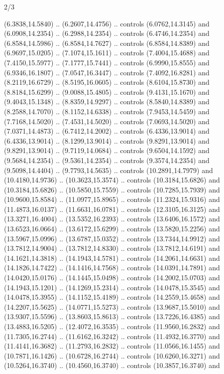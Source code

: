 \begin{flagdescription}{2/3}
\begin{scope}[yshift=\flagwidth,scale=\flagwidth/1241.93737]
\begin{scope}[y=-1mm, x=1mm,draw=gold,fill=blue,line join=miter,miter limit=4,line width=1.8\lw]
{  (6.3838,14.5840) .. (6.2607,14.4756) .. controls (6.0762,14.3145) and
  (6.0908,14.2354) .. (6.2988,14.2354) .. controls (6.4746,14.2354) and
  (6.8584,14.5986) .. (6.8584,14.7627) .. controls (6.8584,14.8389) and
  (6.9697,15.0205) .. (7.1074,15.1611) .. controls (7.4004,15.4688) and
  (7.4150,15.5977) .. (7.1777,15.7441) .. controls (6.9990,15.8555) and
  (6.9346,16.1807) .. (7.0547,16.3447) .. controls (7.4092,16.8281) and
  (8.2119,16.6729) .. (8.5195,16.0605) .. controls (8.6104,15.8730) and
  (8.8184,15.6299) .. (9.0088,15.4805) .. controls (9.4131,15.1670) and
  (9.4043,15.1348) .. (8.8359,14.9297) .. controls (8.5840,14.8389) and
  (8.2588,14.7070) .. (8.1152,14.6338) .. controls (7.9453,14.5459) and
  (7.7168,14.5020) .. (7.4531,14.5020) .. controls (7.0693,14.5020) and
  (7.0371,14.4873) .. (6.7412,14.2002) .. controls (6.4336,13.9014) and
  (6.4336,13.9014) .. (8.1299,13.9014) .. controls (9.8291,13.9014) and
  (9.8291,13.9014) .. (9.7119,14.0684) .. controls (9.6504,14.1592) and
  (9.5684,14.2354) .. (9.5361,14.2354) .. controls (9.3574,14.2354) and
  (9.5098,14.4404) .. (9.7793,14.5635) .. controls (10.2891,14.7979) and
  (10.4180,14.9736) .. (10.3623,15.3574) .. controls (10.3184,15.6826) and
  (10.3184,15.6826) .. (10.5850,15.7559) .. controls (10.7285,15.7939) and
  (10.9600,15.8584) .. (11.0977,15.8965) .. controls (11.2324,15.9316) and
  (11.4873,16.0137) .. (11.6631,16.0781) .. controls (12.3105,16.3125) and
  (13.3271,16.4004) .. (13.5352,16.2393) .. controls (13.6406,16.1572) and
  (13.6523,16.0664) .. (13.6172,15.6299) .. controls (13.5820,15.2256) and
  (13.5967,15.0996) .. (13.6787,15.0352) .. controls (13.7344,14.9912) and
  (13.7812,14.9004) .. (13.7812,14.8330) .. controls (13.7812,14.6191) and
  (14.1621,14.3818) .. (14.1943,14.5781) .. controls (14.2061,14.6631) and
  (14.1826,14.7422) .. (14.1416,14.7568) .. controls (14.0391,14.7891) and
  (14.0420,15.0176) .. (14.1445,15.0498) .. controls (14.2002,15.0703) and
  (14.1943,15.1201) .. (14.1269,15.2314) .. controls (14.0478,15.3545) and
  (14.0478,15.3955) .. (14.1152,15.4189) .. controls (14.2559,15.4658) and
  (14.2207,15.5625) .. (14.0771,15.5273) .. controls (13.9687,15.5010) and
  (13.9307,15.5596) .. (13.8603,15.8613) .. controls (13.7226,16.4385) and
  (13.4883,16.5205) .. (12.4072,16.3535) .. controls (11.9560,16.2832) and
  (11.7305,16.2744) .. (11.6162,16.3242) .. controls (11.4932,16.3770) and
  (11.4141,16.3682) .. (11.2793,16.2832) .. controls (11.0566,16.1455) and
  (10.7871,16.1426) .. (10.6728,16.2744) .. controls (10.6260,16.3271) and
  (10.5264,16.3740) .. (10.4560,16.3740) .. controls (10.3857,16.3740) and
}
\end{scope}
\end{scope}
\end{flagdescription}
